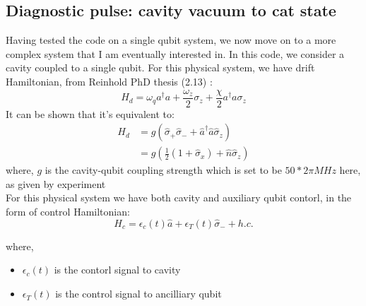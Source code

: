 \documentclass{article}
\begin{document}



\subsection{Diagnostic pulse: cavity vacuum to cat state}
Having tested the code on a single qubit system, we now move on to a more complex system that I am eventually interested in. 
In this code, we consider a cavity coupled to a single qubit.
For this physical system, we have drift Hamiltonian, 
from Reinhold PhD thesis (2.13) \cite{reinhold2019}: 
\begin{equation}
    H_d = \omega_q a^\dagger a + \frac{\omega_z}{2} \sigma_z + \frac{\chi}{2} a^\dagger a \sigma_z
\end{equation}
It can be shown that it's equivalent to: %
$$
\begin{align}
    H_d &= g\left( \hat{\sigma}_+ \hat{\sigma}_- + \hat{a}^{\dagger}\hat{a}\hat{\sigma}_z \right) \\
    &= g \left( \frac{1}{2}(1+\hat{\sigma}_x) + \hat{n}\hat{\sigma}_z\right)
\end{align}
$$  
where, $g$ is the cavity-qubit coupling strength which is set to be $50*2 \pi MHz$ here, as given by experiment
\\
For this physical system we have both cavity and auxiliary qubit contorl, in the form of control Hamiltonian: 
\begin{equation}
    H_c = \epsilon_c(t) \hat{a} + \epsilon_T(t) \hat{\sigma}_- + h.c.
\end{equation}

where, 
\begin{itemize}
    \item $\epsilon_c(t)$ is the contorl signal to cavity
    \item $\epsilon_T(t)$ is the control signal to ancilliary qubit
\end{itemize} 
\end{document}

